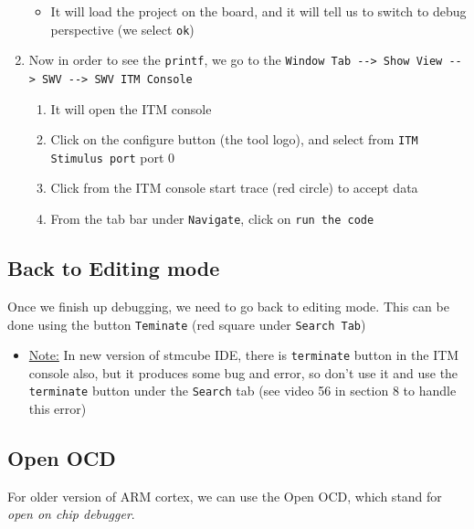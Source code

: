 \begin{enumerate}
    \begin{itemize}
        \item It will load the project on the board, and it will tell us to switch to debug perspective (we select \verb|ok|)
    \end{itemize}
    
    \item Now in order to see the \verb|printf|, we go to the \verb|Window Tab --> Show View --> SWV --> SWV ITM Console|
    
    \begin{enumerate}
        \item It will open the ITM console
        
        \item Click on the configure button (the tool logo), and select from \verb|ITM Stimulus port| port 0
        
        \item Click from the ITM console start trace (red circle) to accept data
        
        \item From the tab bar under \verb|Navigate|, click on \verb|run the code|
    \end{enumerate}
    
\end{enumerate}


\subsection{Back to Editing mode}

Once we finish up debugging, we need to go back to editing mode. This can be done using the button \verb|Teminate| (red square under \verb|Search Tab|)


\begin{itemize}
    \item \underline{Note:} In new version of stmcube IDE, there is \verb|terminate| button in the ITM console also, but it produces some bug and error, so don't use it and use the \verb|terminate| button under the \verb|Search| tab (see video 56 in section 8 to handle this error)
\end{itemize}


\subsection{Open OCD}

For older version of ARM cortex, we can use the Open OCD, which stand for \textit{open on chip debugger}.\\

